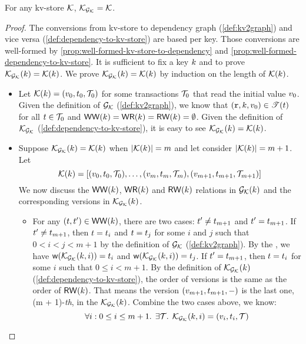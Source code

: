 \begin{proposition}
    \label{prop:bijection:mkvs-dgraph}
For any kv-store $\mathcal{K}$, $\mathcal{K}_{\mathcal{G}_{\mathcal{K}}} = \mathcal{K}$.
\end{proposition}
\begin{proof}
The conversions from kv-store to dependency graph (\cref{def:kv2graph}) and vice versa (\cref{def:dependency-to-kv-store}) are based per key.
Those conversions are well-formed by \cref{prop:well-formed-kv-store-to-dependency} and \cref{prop:well-formed-dependency-to-kv-store}.
It is sufficient to fix a key \( k \) and to prove \( \mathcal{K}_{\mathcal{G}_{\mathcal{K}}}(k) = \mathcal{K}(k) \).
We prove \( \mathcal{K}_{\mathcal{G}_{\mathcal{K}}}(k) = \mathcal{K}(k) \) by induction on the length of \( \mathcal{K}(k) \).

\begin{itemize}
    \item {}
Let \( \mathcal{K}(k) = (v_0, t_0, \mathcal{T}_0 ) \) for some transactions \( \mathcal{T}_0 \) that read the initial value \( v_0 \).
Given the definition of \( \mathcal{G}_{\mathcal{K}} \) (\cref{def:kv2graph}), we know that \( (\textnormal{\texttt r}, k, v_0 ) \in \mathscr{T}(t) \) for all \( t \in \mathcal{T}_0 \) and \( \mathsf{WW}(k) = \mathsf{WR}(k) = \mathsf{RW}(k) = \emptyset  \).
Given the definition of \( \mathcal{K}_{\mathcal{G}_{\mathcal{K}}}\) (\cref{def:dependency-to-kv-store}), it is easy to see \( \mathcal{K}_{\mathcal{G}_{\mathcal{K}}}(k) = \mathcal{K}(k) \).

    \item {}
Suppose \( \mathcal{K}_{\mathcal{G}_{\mathcal{K}}}(k) = \mathcal{K}(k) \) when \( |\mathcal{K}(k)| = m \) and let consider  \( |\mathcal{K}(k)| = m + 1 \).
Let 
\[
    \mathcal{K}(k) = \left[ (v_0, t_0, \mathcal{T}_0 ), \dots, (v_m, t_m, \mathcal{T}_m ), (v_{m+1}, t_{m+1}, \mathcal{T}_{m+1} )  \right] 
\]
We now discuss the \( \mathsf{WW}(k) \), \( \mathsf{WR}(k) \) and \( \mathsf{RW}(k) \) relations in \( \mathcal{G}_{\mathcal{K}}(k) \) and the corresponding versions in \( \mathcal{K}_{\mathcal{G}_{\mathcal{K}}}(k) \).
\begin{itemize}
    \item For any \( (t, t') \in \mathsf{WW}(k) \), there are two cases: \( t' \neq t_{m+1} \) and \( t' = t_{m+1} \).
    If \( t' \neq t_{m+1} \), then \( t = t_i \) and \( t = t_j \) for some \( i \) and \( j \) such that \( 0 < i < j < m + 1 \) by the definition of \( \mathcal{G}_{\mathcal{K}} \) (\cref{def:kv2graph}).
    By the \ih, we have \( \WTx(\hh_{\Gr_\mkvs}(\key,i))  = \txid_i \) and \( \WTx(\hh_{\Gr_\mkvs}(\key,i))  = \txid_j \).
    If \( t' = t_{m + 1} \), then \( t = t_i \) for some \( i \) such that \( 0 \leq i < m + 1 \).
    By the definition of  \( \mathcal{K}_{\mathcal{G}_{\mathcal{K}}}(k) \) (\cref{def:dependency-to-kv-store}), the order of versions is the same as the order of \( \mathsf{RW}(k) \).
    That means the version \( (v_{m+1}, t_{m+1}, - ) \) is the last one, \ie (m + 1)-\emph{th}, in the \( \mathcal{K}_{\mathcal{G}_{\mathcal{K}}}(k) \).
    Combine the two cases above, we know:
    \begin{equation}
        \label{equ:ww-back-to-ww}
        \forall i : 0 \leq i \leq m + 1 \ldotp \; \exists \mathcal{T} \ldotp \; \mathcal{K}_{\mathcal{G}_{\mathcal{K}}}(k, i) = (v_i, t_i, \mathcal{T})
    \end{equation}
    

\end{itemize}
\end{itemize}
\end{proof}

